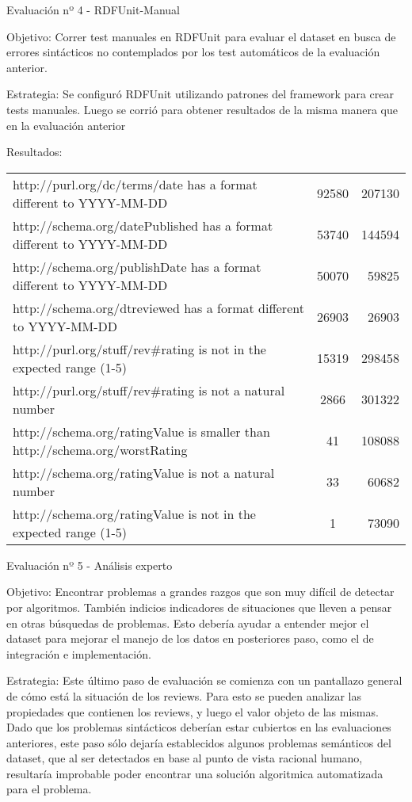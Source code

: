 Evaluación nº 4 - RDFUnit-Manual

Objetivo: Correr test manuales en RDFUnit para evaluar el dataset en busca de errores sintácticos no contemplados por los test
automáticos de la evaluación anterior.

Estrategia: Se configuró RDFUnit utilizando patrones del framework para crear tests manuales. Luego se corrió para obtener resultados
de la misma manera que en la evaluación anterior

Resultados:
\begin{tabular}{| l | c | r | }
http://purl.org/dc/terms/date has a format different to YYYY-MM-DD & 92580 & 207130\\
http://schema.org/datePublished has a format different to YYYY-MM-DD & 53740 & 144594\\
http://schema.org/publishDate has a format different to YYYY-MM-DD & 50070 & 59825\\
http://schema.org/dtreviewed has a format different to YYYY-MM-DD & 26903 & 26903\\ 
http://purl.org/stuff/rev\#rating is not in the expected range (1-5) & 15319 & 298458\\
http://purl.org/stuff/rev\#rating is not a natural number & 2866 & 301322\\
http://schema.org/ratingValue is smaller than http://schema.org/worstRating & 41 & 108088 \\
http://schema.org/ratingValue is not a natural number & 33 & 60682\\
http://schema.org/ratingValue is not in the expected range (1-5) & 1 & 73090 
\end{tabular}

Evaluación nº 5 - Análisis experto

Objetivo: Encontrar problemas a grandes razgos que son muy difícil de detectar por algoritmos. También indicios indicadores de 
situaciones que lleven a pensar en otras búsquedas de problemas. Esto debería ayudar a entender mejor el dataset para mejorar el manejo 
de los datos en posteriores paso, como el de integración e implementación.

Estrategia: Este último paso de evaluación se comienza con un pantallazo general de cómo está la situación de los reviews. Para esto se pueden analizar las propiedades que contienen los reviews, y luego el valor objeto 
de las mismas. Dado que los problemas sintácticos deberían estar cubiertos en las evaluaciones anteriores, este paso sólo dejaría establecidos
algunos problemas semánticos del dataset, que al ser detectados en base al punto de vista racional humano, resultaría improbable poder encontrar
una solución algoritmica automatizada para el problema.

